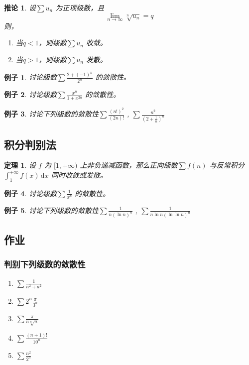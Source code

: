 \documentclass[a4paper,12pt]{article}
\newtheorem{theorem}{定理}
\newtheorem{example}{例子}
\newtheorem{corollary}{推论}
\begin{document}
\begin{corollary}
    设$\displaystyle \sum u_n$ 为正项级数，且
    \[
        \lim_{n \to \infty} \sqrt[n]{u_n} = q
        \]
    则，
    \begin{enumerate}[label={\rm(\arabic*)}]
        \item  当$q < 1$，则级数$\displaystyle \sum u_n$ 收敛。
        \item  当$q > 1$，则级数$\displaystyle \sum u_n$ 发散。
    \end{enumerate}
\end{corollary}

\begin{example}
    讨论级数$\displaystyle \sum \frac{2 + (-1)^n}{2^n}$ 的敛散性。
\end{example}

\begin{example}
    讨论级数$\displaystyle \sum \frac{x^n}{1 + x^{2n}}$ 的敛散性。
\end{example}

\begin{example}
    讨论下列级数的敛散性$\displaystyle \sum \frac{(n!)^2}{(2n)!}$ ,
    $\displaystyle \sum \frac{n^2}{\left(2 + \frac{1}{n}\right)^n}$
\end{example}

\subsection{积分判别法}
\begin{theorem}
    设 $f$ 为 $[1, +\infty)$ 上非负递减函数，那么正向级数$\sum f(n)$ 
    与反常积分 $\displaystyle \int_1^{+\infty} f(x)\,\mathrm{d}x$
    同时收敛或发散。
\end{theorem}

\begin{example}
    讨论级数$\displaystyle \sum \frac{1}{x^p}$ 的敛散性。
\end{example}

\begin{example}
    讨论下列级数的敛散性$\displaystyle \sum \frac{1}{n\left(\ln n\right)^n}$ ,
    $\displaystyle \sum \frac{1}{n \ln n \left(\ln \ln n\right)^n}$
\end{example}

\subsection{作业}
\subsubsection{判别下列级数的敛散性}
\begin{enumerate}[label={\rm(\arabic*)}]
    \item $\displaystyle \sum \frac{1}{n^2 + a^2}$
    \item $\displaystyle \sum 2^n\frac{\pi}{3^n}$
    \item $\displaystyle \sum \frac{\pi}{n\sqrt[n]n}$
    \item $\displaystyle \sum \frac{(n+1)!}{10^n}$
    \item $\displaystyle \sum \frac{n^2}{2^n}$
\end{enumerate}
\end{document}
